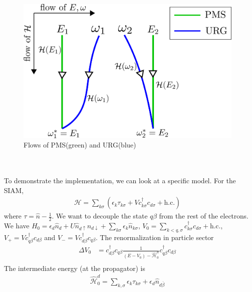 \documentclass[twoside]{report}
\numberwithin{equation}{section}
\begin{document}
\begin{figure}
\centering
\includegraphics[scale=0.42]{pms_vs_urg.png}
\caption{Flows of PMS(green) and URG(blue)}
\end{figure}
\\\\To demonstrate the implementation, we can look at a specific model. For the SIAM,
\begin{equation}\begin{aligned}
	\mathcal{H} = \sum_{k\sigma}\left(\epsilon_k \tau_{k\sigma} + V c^\dagger_{k\sigma}c_{d\sigma} + \text{h.c.}\right)
\end{aligned}\end{equation}
where \(\tau = \hat n - \frac{1}{2}\). We want to decouple the state \(q\beta\) from the rest of the electrons. We have \({H}_0 = \epsilon_d\hat n_d + U \hat n_{d\uparrow}n_{d\downarrow} + \sum_{k\sigma} \epsilon_k \hat n_{k\sigma}\), \(V_0 = \sum_{k<q,\sigma}c^\dagger_{k\sigma}c_{d\sigma}+\text{h.c.}\), \(V_+ = V c^\dagger_{q\beta}c_{d\beta}\) and \(V_- = V c^\dagger_{d\beta}c_{q\beta}\). The renormalization in particle sector
\begin{equation}\begin{aligned}
	\Delta V_0 &=  c^\dagger_{d\beta}c_{q\beta}\frac{1}{\left(E - V_0\right) - \hat{\mathcal{H}}^d_0}c^\dagger_{q\beta}c_{d\beta}\\
\end{aligned}\end{equation}
The intermediate energy (at the propagator) is
\begin{equation}\begin{aligned}
	\hat{\mathcal{H}}^d_0 = \sum_{k,\sigma}\epsilon_k \tau_{k\sigma} + \epsilon_d \hat n_{d\overline\beta}
\end{aligned}\end{equation}
\end{document}
